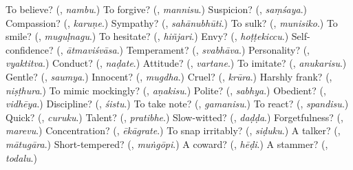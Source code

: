 \begin{tcolorbox}[breakable,colback=teal!4,colframe=teal!35!black,title={Before you move on}]
To believe? (\textbf{}, \emph{nambu}.) To forgive? (\textbf{}, \emph{mannisu}.) Suspicion? (\textbf{}, \emph{saṃśaya}.) Compassion? (\textbf{}, \emph{karuṇe}.) Sympathy? (\textbf{}, \emph{sahānubhūti}.) To sulk? (\textbf{}, \emph{munisiko}.) To smile? (\textbf{}, \emph{muguḷnagu}.) To hesitate? (\textbf{}, \emph{hiñjari}.) Envy? (\textbf{}, \emph{hoṭṭekiccu}.) Self-confidence? (\textbf{}, \emph{ātmaviśvāsa}.) Temperament? (\textbf{}, \emph{svabhāva}.) Personality? (\textbf{}, \emph{vyaktitva}.) Conduct? (\textbf{}, \emph{naḍate}.) Attitude? (\textbf{}, \emph{vartane}.) To imitate? (\textbf{}, \emph{anukarisu}.) Gentle? (\textbf{}, \emph{saumya}.) Innocent? (\textbf{}, \emph{mugdha}.) Cruel? (\textbf{}, \emph{krūra}.) Harshly frank? (\textbf{}, \emph{niṣṭhura}.) To mimic mockingly? (\textbf{}, \emph{aṇakisu}.) Polite? (\textbf{}, \emph{sabhya}.) Obedient? (\textbf{}, \emph{vidhēya}.) Discipline? (\textbf{}, \emph{śistu}.) To take note? (\textbf{}, \emph{gamanisu}.) To react? (\textbf{}, \emph{spandisu}.) Quick? (\textbf{}, \emph{curuku}.) Talent? (\textbf{}, \emph{pratibhe}.) Slow-witted? (\textbf{}, \emph{daḍḍa}.) Forgetfulness? (\textbf{}, \emph{marevu}.) Concentration? (\textbf{}, \emph{ēkāgrate}.) To snap irritably? (\textbf{}, \emph{siḍuku}.) A talker? (\textbf{}, \emph{mātugāra}.) Short-tempered? (\textbf{}, \emph{muṅgōpi}.) A coward? (\textbf{}, \emph{hēḍi}.) A stammer? (\textbf{}, \emph{todalu}.)
\end{tcolorbox}
